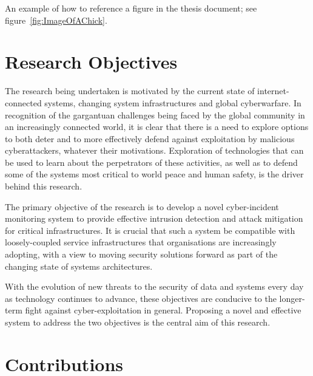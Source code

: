 An example of how to reference a figure in the thesis document; see figure~\ref{fig:ImageOfAChick}.



\section{Research Objectives} 
The research being undertaken is motivated by the current state of internet-connected systems, changing system infrastructures and global cyberwarfare. In recognition of the gargantuan challenges being faced by the global community in an increasingly connected world, it is clear that there is a need to explore options to both deter and to more effectively defend against exploitation by malicious cyberattackers, whatever their motivations. Exploration of technologies that can be used to learn about the perpetrators of these activities, as well as to defend some of the systems most critical to world peace and human safety, is the driver behind this research. 

The primary objective of the research is to	develop a novel cyber-incident monitoring system to provide effective intrusion detection and attack mitigation for critical infrastructures. It is crucial that such a system be compatible with loosely-coupled service infrastructures that organisations are increasingly adopting, with a view to moving security solutions forward as part of the changing state of systems architectures.

With the evolution of new threats to the security of data and systems every day as technology continues to advance, these objectives are conducive to the longer-term fight against cyber-exploitation in general. Proposing a novel and effective system to address the two objectives is the central aim of this research.

\section{Contributions}

